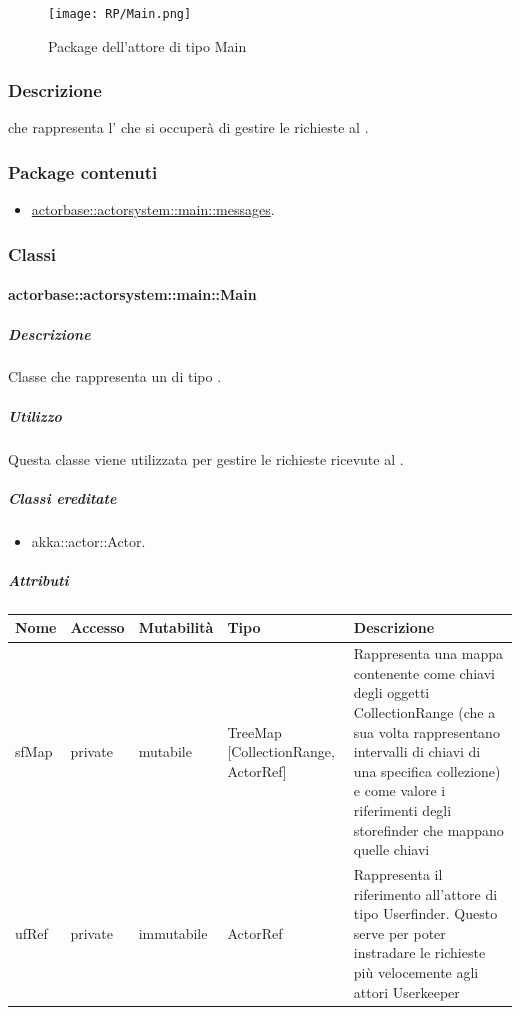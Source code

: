 \documentclass{scalatekids-article}
\begin{document}
\begin{figure}[H]
  \begin{center}
    \texttt{[image: RP/Main.png]}
    \caption{Package dell'attore di tipo Main}
  \end{center}
\end{figure}

\subsubsection{Descrizione}
 che rappresenta l' che si occuperà di gestire le
richieste al .

\subsubsection{Package contenuti}
\begin{itemize}
  \item \hyperref[sec:actorbase::actorsystem::main::messages]{actorbase::actorsystem::main::messages}.
\end{itemize}

\subsubsection{Classi}

\paragraph{actorbase::actorsystem::main::Main}
\label{sec:actorbase::actorsystem::main::Main}

\subparagraph{Descrizione}
Classe che rappresenta un  di tipo .

\subparagraph{Utilizzo}
Questa classe viene utilizzata per gestire le richieste ricevute al
.

\subparagraph{Classi ereditate}
\begin{itemize}
  \item akka::actor::Actor.
\end{itemize}

\subparagraph{Attributi}
\begin{tabular}{| p{3cm} | p{1.5cm} | p{2cm} | p{2cm} | p{8.5cm} |}
  \hline
  Nome & Accesso & Mutabilità & Tipo & Descrizione\\
  \hline
  sfMap & private & mutabile & TreeMap [CollectionRange, ActorRef] & Rappresenta una mappa contenente come chiavi degli oggetti CollectionRange (che a sua volta rappresentano intervalli di chiavi di una specifica collezione) e come valore i riferimenti degli storefinder che mappano quelle chiavi \\
  \hline
  ufRef & private & immutabile & ActorRef & Rappresenta il riferimento all'attore di tipo Userfinder. Questo serve per poter instradare le richieste più velocemente agli attori Userkeeper \\
  \hline
\end{tabular}
\end{document}
